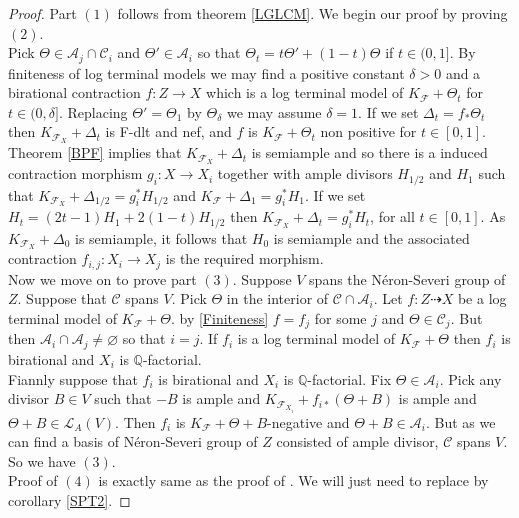 \documentclass[12pt]{amsart}%
\theoremstyle{plain}
\theoremstyle{remark}
\theoremstyle{definition}
\newcommand{\<}{\leq}
\newcommand{\mbQ}{\mathbb{Q}}
\theoremstyle{definition}
\theoremstyle{definition}
\numberwithin{equation}{section}
\theoremstyle{remark}
\begin{document}
\begin{proof}
 Part $(1)$ follows from theorem \ref{LGLCM}. We begin our proof by proving $(2)$.\\
Pick $\Theta\in \mathcal{A}_j\cap\mathcal{C}_i$ and $\Theta'\in \mathcal{A}_i$ so that $\Theta_t= t\Theta'+(1-t)\Theta$ if $t\in (0,1]$. By finiteness of log terminal models we may find a positive constant $\delta>0$ and a birational contraction $f:Z\rightarrow X$ which is a log terminal model of $K_{\mathcal{F}}+\Theta_t$ for $t\in (0,\delta]$. Replacing $\Theta'=\Theta_1$ by $\Theta_{\delta}$ we may assume $\delta=1$. If we set $\Delta_t=f_*\Theta_t$ then $K_{\mathcal{F}_X}+\Delta_t$ is F-dlt and nef, and $f$ is $K_{\mathcal{F}}+\Theta_t$ non positive for $t\in [0,1]$. Theorem \ref{BPF} implies that $K_{\mathcal{F}_X}+\Delta_t$ is semiample and so there is a induced contraction morphism $g_i:X\rightarrow X_i$ together with ample divisors $H_{1/2}$ and $H_1$ such that $K_{\mathcal{F}_X}+\Delta_{1/2}=g_i^*H_{1/2}$ and $K_{\mathcal{F}}+\Delta_1=g_i^*H_1$. If we set $H_t=(2t-1)H_1+2(1-t)H_{1/2}$ then $K_{\mathcal{F}_X}+\Delta_t=g_i^*H_t$, for all $t\in [0,1]$.
As $K_{\mathcal{F}_X}+\Delta_0$ is semiample, it follows that $H_0$ is semiample and the associated contraction $f_{i,j}:X_i\rightarrow X_j$ is the required morphism.\\
Now we move on to prove part $(3)$. Suppose $V$ spans the N\'eron-Severi group of $Z$. Suppose that $\mathcal{C}$ spans $V$. Pick $\Theta$ in the interior of $\mathcal{C}\cap \mathcal{A}_i$. Let $f:Z\dashrightarrow X$ be a log terminal model of $K_{\mathcal{F}}+\Theta$. by \ref{Finiteness} $f=f_j$ for some $j$ and $\Theta\in \mathcal{C}_j$. But then $\mathcal{A}_i\cap \mathcal{A}_j\neq \varnothing$ so that $i=j$. If $f_i$ is a log terminal model of $K_{\mathcal{F}}+\Theta$ then $f_i$ is birational and $X_i$ is $\mbQ$-factorial.\\
Fiannly suppose that $f_i$ is birational and $X_i$ is $\mbQ$-factorial. Fix $\Theta\in \mathcal{A}_i$. Pick any divisor $B\in V$ such that $-B$ is ample and $K_{\mathcal{F}_{X_i}}+f_{i*}(\Theta+B)$ is ample and $\Theta+B\in\mathcal{L}_A(V)$. Then $f_i$ is $K_{\mathcal{F}}+\Theta+B$-negative and $\Theta+B\in \mathcal{A}_i$. But as we can find a basis of N\'eron-Severi group of $Z$ consisted of ample divisor, $\mathcal{C}$ spans $V$. So we have $(3)$.\\
Proof of $(4)$ is exactly same as the proof of \cite[$(4)$ of Theorem $3.3$]{HM09}. We will just need to replace \cite[Corollary $3.11.3$]{BCHM} by corollary \ref{SPT2}.

 
\end{proof}
\end{document}

